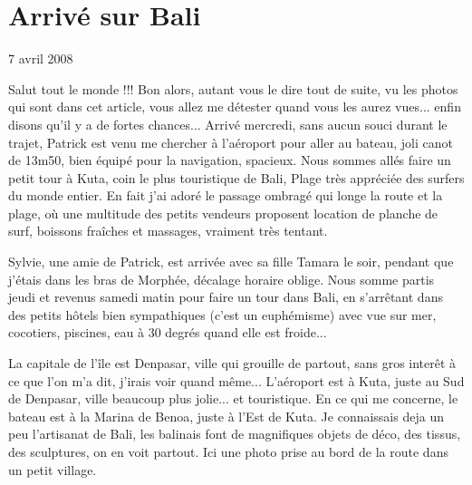 \section{Arrivé sur Bali}

7 avril 2008

\begin{multicols}{2}

Salut tout le monde !!! Bon alors, autant vous le dire tout de suite, vu les photos qui sont dans cet article, vous allez me détester quand vous les aurez vues... enfin disons qu'il y a de fortes chances... Arrivé mercredi, sans aucun souci durant le trajet, Patrick est venu me chercher à l'aéroport pour aller au bateau, joli canot de 13m50, bien équipé pour la navigation, spacieux. Nous sommes allés faire un petit tour à Kuta, coin le plus touristique de Bali, Plage très appréciée des surfers du monde entier. En fait j'ai adoré le passage ombragé qui longe la route et la plage, où une multitude des petits vendeurs proposent location de planche de surf, boissons fraîches et massages, vraiment très tentant.


Sylvie, une amie de Patrick, est arrivée avec sa fille Tamara le soir, pendant que j'étais dans les bras de Morphée, décalage horaire oblige. Nous somme partis jeudi et revenus samedi matin pour faire un tour dans Bali, en s'arrêtant dans des petits hôtels bien sympathiques (c'est un euphémisme) avec vue sur mer, cocotiers, piscines, eau à 30 degrés quand elle est froide...





La capitale de l'île est Denpasar, ville qui grouille de partout, sans gros interêt à ce que l'on m'a dit, j'irais voir quand même... L'aéroport est à Kuta, juste au Sud de Denpasar, ville beaucoup plus jolie... et touristique. En ce qui me concerne, le bateau est à la Marina de Benoa, juste à l'Est de Kuta. Je connaissais deja un peu l'artisanat de Bali, les balinais font de magnifiques objets de déco, des tissus, des sculptures, on en voit partout. Ici une photo prise au bord de la route dans un petit village.


\end{multicols}
